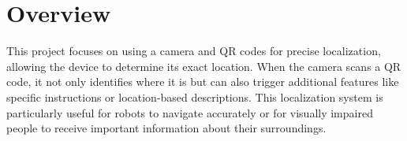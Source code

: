 \section{Overview}
\color{red}
This project focuses on using a camera and QR codes for precise localization, allowing the device to determine its exact location. When the camera scans a QR code, it not only identifies where it is but can also trigger additional features like specific instructions or location-based descriptions. This localization system is particularly useful for robots to navigate accurately or for visually impaired people to receive important information about their surroundings.
\color{black}


